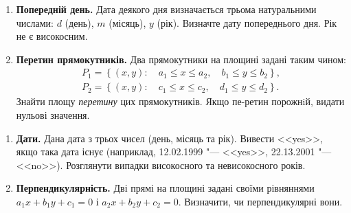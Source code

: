 \documentclass{scrreprt}
\begin{document}
	\vspace{2cm}
	
	
	{\large
		\begin{enumerate}
			\item \textbf{Попередній день.} Дата деякого дня визначається трьома натуральними числами: $d$ (день), $m$ (місяць), $y$ (рік). Визначте дату попереднього дня. Рік не є високосним.
			\item \textbf{Перетин прямокутників.} Два прямокутники на площині задані таким чином:
			$$
			\begin{array}{c}
				P_1 = \left\{(x, y):\quad a_1\leqslant x\leqslant a_2,\quad b_1\leqslant y\leqslant b_2\right\},\\ 
				P_2 = \left\{(x, y):\quad c_1\leqslant x\leqslant c_2,\quad d_1\leqslant y\leqslant d_2\right\}.
			\end{array}
			$$
			Знайти площу {\itshape перетину} цих прямокутників. Якщо пе-ре\-тин порожнiй, видати нульові значення.
			
		\end{enumerate}
	}
	
	\newpage
	
	
	{\large
		\begin{enumerate}
			\item \textbf{Дати.} Дана дата з трьох чисел (день, місяць та рік). Вивести <<yes>>, якщо така дата існує (наприклад, 12.02.1999 "--- <<yes>>, 22.13.2001 "--- <<no>>). Розглянути випадки високосного та невисокосного років.
			\item \textbf{Перпендикулярність.} Дві прямі на площині задані своїми рівняннями $a_1 x+b_1 y +c_1=0$ і $a_2 x+b_2 y +c_2=0$. Визначити, чи перпендикулярні вони.
		\end{enumerate}
	}
	
	
	\vspace{2cm}
	
\end{document}

